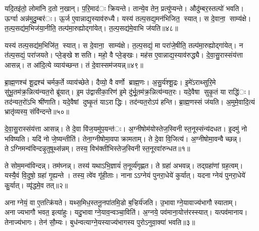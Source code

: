 यदि॒तइ॑तो॒ लोमा॑नि द॒तो न॒खान्। प॒रि॒माद॑ः क्रियन्ते। तान्ये॒व तेन॒ प्रत्यु॑प्यन्ते। औदु॑म्बर॒स्तल्पो॑ भवति। ऊर्ग्वा अन्न॑मुदु॒म्बर॑ः। ऊ॒र्ज ए॒वान्नाद्य॒स्याव॑रुध्यै। यस्य॑ तल्प॒सद्य॒मन॑भिजित॒ स्यात्। स दे॒वाना॒ साम्य॑क्षे। त॒ल्प॒सद्य॑म॒भिज॑या॒नीति॒ तल्प॑मा॒रुह्योद्गा॑येत्। त॒ल्प॒सद्य॑मे॒वाभि ज॑यति॥४८॥

यस्य॑ तल्प॒सद्य॑म॒भिजि॑त॒ स्यात्। स दे॒वाना॒ साम्य॑क्षे। त॒ल्प॒सद्यं॒ मा परा॑जे॒षीति॒ तल्प॑मा॒रुह्योद्गा॑येत्। न त॑ल्प॒सद्यं॒ परा॑जयते। प्ले॒ङ्खे शसति। महो॒ वै प्ले॒ङ्खः। मह॑स ए॒वान्नाद्य॒स्याव॑रुद्ध्यै। दे॒वा॒सु॒रास्संय॑त्ता आसन्न्। त आ॑दि॒त्ये व्याय॑च्छन्त। तं दे॒वास्सम॑जयन्न्॥४९॥

ब्रा॒ह्म॒णश्च॑ शू॒द्रश्च॑ चर्मक॒र्ते व्याय॑च्छेते। दैव्यो॒ वै वर्णो ब्राह्म॒णः। अ॒सु॒र्य॑श्शू॒द्रः। इ॒मे॑ऽराथ्सुरि॒मे सु॑भू॒तम॑क्र॒न्नित्य॑न्यत॒रो ब्रू॑यात्। इ॒म उ॑द्वासीका॒रिण॑ इ॒मे दु॑र्भू॒तम॑क्र॒न्नित्य॑न्यत॒रः। यदे॒वैषा सुकृ॒तं या राद्धि॑ः। तद॑न्यत॒रो॑ऽभि श्री॑णाति। यदे॒वैषां दुष्कृ॒तं याऽराद्धिः। तद॑न्यत॒रोऽप॑ हन्ति। ब्रा॒ह्म॒णस्सं ज॑यति। अ॒मुमे॒वादि॒त्यं भ्रातृ॑व्यस्य॒ संवि॑न्दन्ते॥५०॥




दे॒वा॒सु॒रास्संय॑त्ता आसन्न्। ते दे॒वा वि॑ज॒यमु॑प॒यन्त॑ः। अ॒ग्नीषोम॑योस्तेज॒स्विनीस्त॒नूस्संन्य॑दधत। इ॒दमु॑ नो भविष्यति। यदि॑ नो जे॒ष्यन्तीति॑। तेना॒ग्नीषोमा॒वपाक्रामताम्। ते दे॒वा वि॒जित्य॑। अ॒ग्नीषोमा॒वन्वैच्छन्न्। तेऽग्निमन्व॑विन्दन्नृ॒तुषूथ्स॑न्नम्। तस्य॒ विभ॑क्तीभिस्तेज॒स्विनीस्त॒नूरवा॑रुन्धत॥१॥

ते सोम॒मन्व॑विन्दन्न्। तम॑घ्नन्न्। तस्य॑ यथाऽभि॒ज्ञायं॑ त॒नूर्व्य॑गृह्णत। ते ग्रहा॑ अभवन्न्। तद्ग्रहा॑णां ग्रह॒त्वम्। यस्यै॒वं वि॒दुषो॒ ग्रहा॑ गृ॒ह्यन्ते। तस्य॒ त्वे॑व गृ॑ही॒ताः। नानाऽऽग्नेयं पुनरा॒धेये॑ कुर्यात्। यदनाग्नेयं पुनरा॒धेये॑ कु॒र्यात्। व्यृ॑द्धमे॒व तत्॥२॥

अनाग्नेयं॒ वा ए॒तत्क्रि॑यते। यथ्स॒मिध॒स्तनू॒नपा॑तमि॒डो ब॒ऱ्हिर्य॑जति। उ॒भावाग्ने॒यावाज्य॑भागौ स्याताम्। अनाज्यभागौ भवत॒ इत्या॑हुः। यदु॒भावाग्ने॒याव॒न्वञ्चा॒विति॑। अ॒ग्नये॒ पव॑माना॒योत्त॑रस्स्यात्। यत्पव॑मानाय। तेनाज्य॑भागः। तेन॑ सौ॒म्यः। बुध॑न्वत्याग्ने॒यस्याज्य॑भागस्य पुरोऽनुवा॒क्या॑ भवति॥३॥

